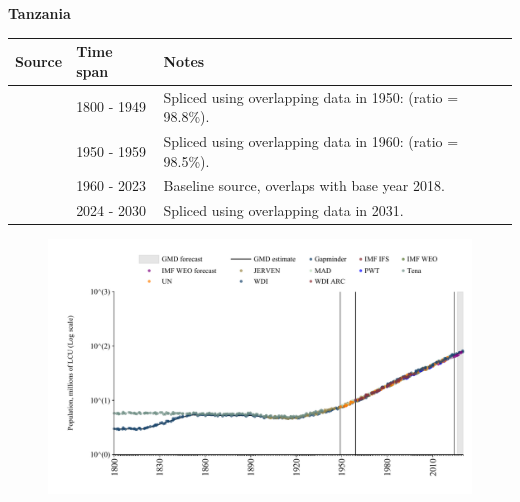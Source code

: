 \documentclass[12pt,a4paper,landscape]{article}
\begin{document}
\begin{adjustbox}{max totalsize={\paperwidth}{\paperheight},center}
\begin{minipage}[t][\textheight][t]{\textwidth}
\vspace*{0.5cm}
{}
\begin{center}
{\Large\bfseries Tanzania}
\end{center}
\vspace{0.5cm}
\begin{table}[H]
\centering
\small
\begin{tabular}{|l|l|l|}
\hline
\textbf{Source} & \textbf{Time span} & \textbf{Notes} \\
\hline
\rowcolor{white}\cite{Gapminder}& 1800 - 1949 &Spliced using overlapping data in 1950: (ratio = 98.8\%).\\
\rowcolor{lightgray}\cite{IMF_IFS}& 1950 - 1959 &Spliced using overlapping data in 1960: (ratio = 98.5\%).\\
\rowcolor{white}\cite{WDI}& 1960 - 2023 &Baseline source, overlaps with base year 2018.\\
\rowcolor{lightgray}\cite{Gapminder}& 2024 - 2030 &Spliced using overlapping data in 2031.\\
\hline
\end{tabular}
\end{table}
\begin{figure}[H]
\centering
\includegraphics[width=\textwidth,height=0.6\textheight,keepaspectratio]{graphs/TZA_pop.pdf}
\end{figure}
\end{minipage}
\end{adjustbox}
\end{document}
